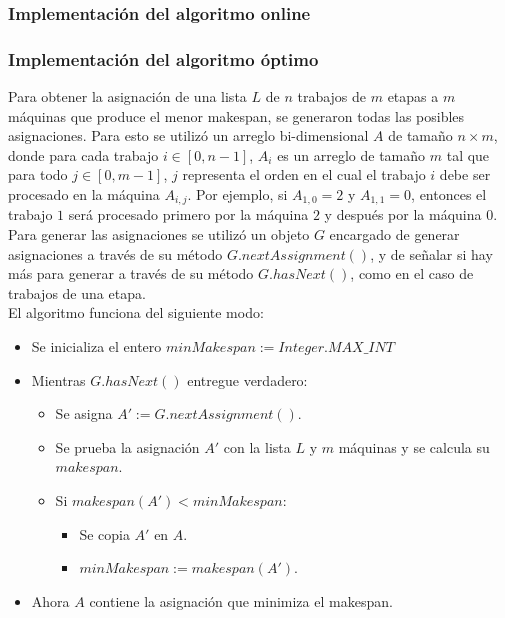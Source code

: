 \documentclass[12pt,letterpaper]{article}
\begin{document}
\subsubsection{Implementación del algoritmo online}

\subsubsection{Implementación del algoritmo óptimo}
Para obtener la asignación de una lista $L$ de $n$ trabajos de $m$ etapas a $m$ máquinas que produce el menor makespan, se generaron todas las posibles asignaciones. Para esto se utilizó un arreglo bi-dimensional $A$ de tamaño $n \times m$, donde para cada trabajo $i \in [0, n-1]$, $A_{i}$ es un arreglo de tamaño $m$ tal que para todo $j \in [0, m-1]$, $j$ representa el orden en el cual el trabajo $i$ debe ser procesado en la máquina $A_{i,j}$. Por ejemplo, si $A_{1,0} = 2$ y $A_{1,1} = 0$, entonces el trabajo $1$ será procesado primero por la máquina $2$ y después por la máquina $0$. \\

Para generar las asignaciones se utilizó un objeto $G$ encargado de generar asignaciones a través de su método $G.nextAssignment()$, y de señalar si hay más para generar a través de su método $G.hasNext()$, como en el caso de trabajos de una etapa.\\

El algoritmo funciona del siguiente modo:

\begin{itemize}
\item Se inicializa el entero $minMakespan := Integer.MAX\_INT$
\item Mientras $G.hasNext()$ entregue verdadero:
	\begin{itemize}
	\item Se asigna $A' := G.nextAssignment()$.
	\item Se prueba la asignación $A'$ con la lista $L$ y $m$ máquinas y se calcula su $makespan$.
	\item Si $makespan(A') < minMakespan$:
		\begin{itemize}
		\item Se copia $A'$ en $A$. 
		\item $minMakespan := makespan(A')$.
		\end{itemize}
	\end{itemize}
\item Ahora $A$ contiene la asignación que minimiza el makespan.
\end{itemize}
\end{document}
